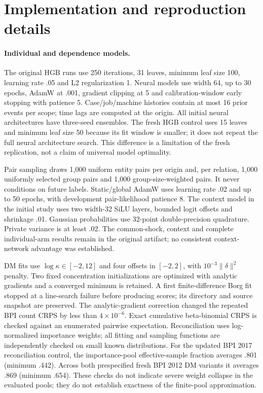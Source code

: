 \section{Implementation and reproduction details}
\paragraph{Individual and dependence models.}
The original HGB runs use 250 iterations, 31 leaves, minimum leaf size 100,
learning rate .05 and L2 regularization 1. Neural models use width 64, up to
30 epochs, AdamW at .001, gradient clipping at 5 and calibration-window
early stopping with patience 5. Case/job/machine histories contain at most
16 prior events per scope; time lags are computed at the origin. All initial
neural architectures have three-seed ensembles. The fresh HGB control uses
15 leaves and minimum leaf size 50 because its fit window is smaller; it
does not repeat the full neural architecture search. This difference is a
limitation of the fresh replication, not a claim of universal model optimality.

Pair sampling draws 1,000 uniform entity pairs per origin and, per relation,
1,000 uniformly selected group pairs and 1,000 group-size-weighted pairs.
It never conditions on future labels. Static/global AdamW uses learning rate
.02 and up to 50 epochs, with development pair-likelihood patience 8.
The context model in the initial study uses two width-32 SiLU layers,
bounded logit offsets and shrinkage .01. Gaussian probabilities use
32-point double-precision quadrature. Private variance is at least .02.
The common-shock, context and complete individual-arm results remain in the
original artifact; no consistent context-network advantage was established.

DM fits use $\log\kappa\in[-2,12]$ and four offsets in $[-2,2]$, with
$10^{-3}\|\delta\|^2$ penalty. Two fixed concentration initializations are
optimized with analytic gradients and a converged minimum is retained.
A first finite-difference Borg fit stopped at a line-search failure before
producing scores; its directory and source snapshot are preserved. The
analytic-gradient correction changed the repeated BPI count CRPS by less
than $4\times10^{-6}$. Exact cumulative beta-binomial CRPS is checked against
an enumerated pairwise expectation. Reconciliation uses log-normalized
importance weights; all fitting and sampling functions are independently
checked on small known distributions.
For the updated BPI 2017 reconciliation control, the importance-pool
effective-sample fraction averages .801 (minimum .442). Across both
prespecified fresh BPI 2012 DM variants it averages .869 (minimum .654).
These checks do not indicate severe weight collapse in the evaluated pools;
they do not establish exactness of the finite-pool approximation.

